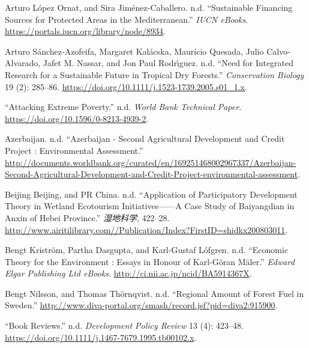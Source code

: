 \begin{CSLReferences}{1}{0}
Arturo López Ornat, and Sira Jiménez-Caballero. n.d. {``Sustainable
Financing Sources for Protected Areas in the Mediterranean.''}
\emph{IUCN eBooks}. \url{https://portals.iucn.org/library/node/8934}.

Arturo Sánchez‐Azofeifa, Margaret Kalácska, Maurício Quesada, Julio
Calvo‐Alvarado, Jafet M. Nassar, and Jon Paul Rodrı́guez. n.d. {``Need
for Integrated Research for a Sustainable Future in Tropical Dry
Forests.''} \emph{Conservation Biology} 19 (2): 285--86.
\url{https://doi.org/10.1111/j.1523-1739.2005.s01_1.x}.

{``Attacking Extreme Poverty.''} n.d. \emph{World Bank Technical Paper}.
\url{https://doi.org/10.1596/0-8213-4939-2}.

Azerbaijan. n.d. {``Azerbaijan - Second Agricultural Development and
Credit Project : Environmental Assessment.''}
\url{http://documents.worldbank.org/curated/en/169251468002967337/Azerbaijan-Second-Agricultural-Development-and-Credit-Project-environmental-assessment}.

Beijing Beijing, and PR China. n.d. {``Application of Participatory
Development Theory in Wetland Ecotourism Initiatives------A Case Study
of Baiyangdian in Anxin of Hebei Province.''} \emph{湿地科学}, 422--28.
\url{http://www.airitilibrary.com//Publication/Index?FirstID=shidkx200803011}.

Bengt Kriström, Partha Dasgupta, and Karl‐Gustaf Lófgren. n.d.
{``Economic Theory for the Environment : Essays in Honour of Karl-Göran
Mäler.''} \emph{Edward Elgar Publishing Ltd eBooks}.
\url{http://ci.nii.ac.jp/ncid/BA5914367X}.

Bengt Nilsson, and Thomas Thörnqvist. n.d. {``Regional Amount of Forest
Fuel in Sweden.''}
\url{http://www.diva-portal.org/smash/record.jsf?pid=diva2:915900}.

{``Book Reviews.''} n.d. \emph{Development Policy Review} 13 (4):
423--48. \url{https://doi.org/10.1111/j.1467-7679.1995.tb00102.x}.


\end{CSLReferences}
